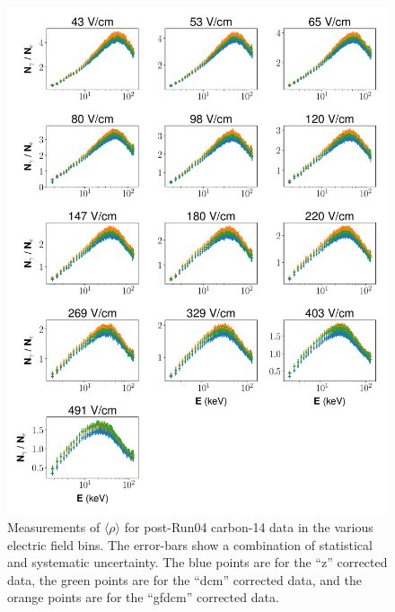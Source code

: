 \begin{figure}[!h]
\centering
  \includegraphics[width=\textwidth]{Figures/C14_rho_final.pdf}
\caption{Measurements of $\langle \rho \rangle$ for post-Run04 carbon-14 data in the various electric field bins. The error-bars show a combination of statistical and systematic uncertainty. The blue points are for the ``z'' corrected data, the green points are for the ``dcm'' corrected data, and the orange points are for the ``gfdcm'' corrected data.}
\label{fig:C14_rho_final}
\end{figure}
